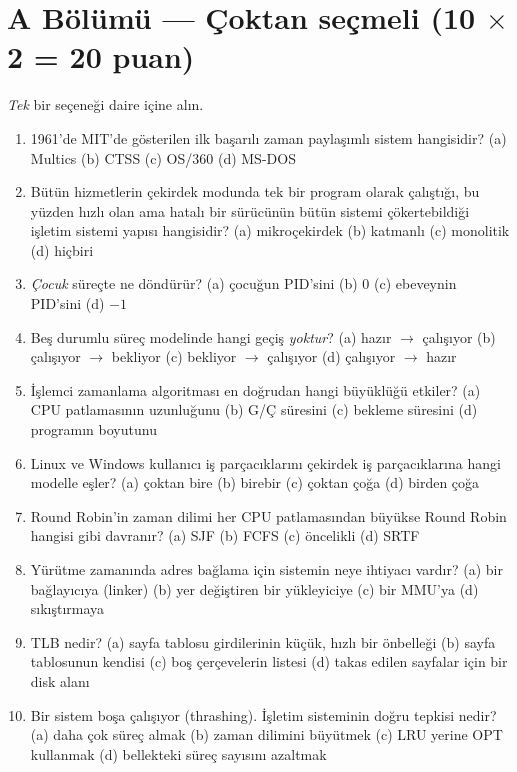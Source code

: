 \section*{A Bölümü --- Çoktan seçmeli \hfill (10 $\times$ 2 = 20 puan)}
\emph{Tek} bir seçeneği daire içine alın.
\begin{enumerate}[leftmargin=2.0em,label=A\arabic*.,itemsep=0.15em]
  \item 1961'de MIT'de gösterilen ilk başarılı zaman paylaşımlı sistem hangisidir? \quad (a) Multics \quad (b) CTSS \quad (c) OS/360 \quad (d) MS-DOS
  \item Bütün hizmetlerin çekirdek modunda tek bir program olarak çalıştığı, bu yüzden hızlı olan ama hatalı bir sürücünün bütün sistemi çökertebildiği işletim sistemi yapısı hangisidir? \quad (a) mikroçekirdek \quad (b) katmanlı \quad (c) monolitik \quad (d) hiçbiri
  \item \emph{Çocuk} süreçte  ne döndürür? \quad (a) çocuğun PID'sini \quad (b) $0$ \quad (c) ebeveynin PID'sini \quad (d) $-1$
  \item Beş durumlu süreç modelinde hangi geçiş \emph{yoktur}? \quad (a) hazır $\to$ çalışıyor \quad (b) çalışıyor $\to$ bekliyor \quad (c) bekliyor $\to$ çalışıyor \quad (d) çalışıyor $\to$ hazır
  \item İşlemci zamanlama algoritması en doğrudan hangi büyüklüğü etkiler? \quad (a) CPU patlamasının uzunluğunu \quad (b) G/Ç süresini \quad (c) bekleme süresini \quad (d) programın boyutunu
  \item Linux ve Windows kullanıcı iş parçacıklarını çekirdek iş parçacıklarına hangi modelle eşler? \quad (a) çoktan bire \quad (b) birebir \quad (c) çoktan çoğa \quad (d) birden çoğa
  \item Round Robin'in zaman dilimi her CPU patlamasından büyükse Round Robin hangisi gibi davranır? \quad (a) SJF \quad (b) FCFS \quad (c) öncelikli \quad (d) SRTF
  \item Yürütme zamanında adres bağlama için sistemin neye ihtiyacı vardır? \quad (a) bir bağlayıcıya (linker) \quad (b) yer değiştiren bir yükleyiciye \quad (c) bir MMU'ya \quad (d) sıkıştırmaya
  \item TLB nedir? \quad (a) sayfa tablosu girdilerinin küçük, hızlı bir önbelleği \quad (b) sayfa tablosunun kendisi \quad (c) boş çerçevelerin listesi \quad (d) takas edilen sayfalar için bir disk alanı
  \item Bir sistem boşa çalışıyor (thrashing). İşletim sisteminin doğru tepkisi nedir? \quad (a) daha çok süreç almak \quad (b) zaman dilimini büyütmek \quad (c) LRU yerine OPT kullanmak \quad (d) bellekteki süreç sayısını azaltmak
\end{enumerate}

